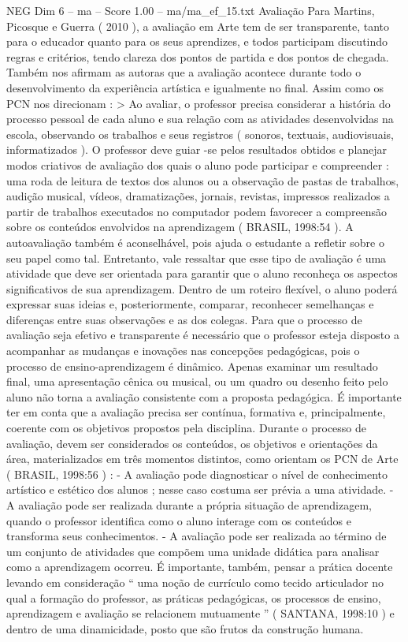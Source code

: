 \begin{textsample}{NEG Dim 6 – ma – Score 1.00 – ma/ma\_ef\_15.txt}  \label{ex:f6_neg_192}
Avaliação Para Martins, Picosque e Guerra ( 2010 ), a avaliação em Arte tem de ser transparente, tanto para o educador quanto para os seus aprendizes, e todos participam discutindo regras e critérios, tendo clareza dos pontos de partida e dos pontos de chegada.
Também nos afirmam as autoras que a avaliação acontece durante todo o desenvolvimento da experiência artística e igualmente no final.
Assim como os PCN nos direcionam : > Ao avaliar, o professor precisa considerar a história do processo pessoal de cada aluno e sua relação com as atividades desenvolvidas na escola, observando os trabalhos e seus registros ( sonoros, textuais, audiovisuais, informatizados ).
O professor deve guiar -se pelos resultados obtidos e planejar modos criativos de avaliação dos quais o aluno pode participar e compreender : uma roda de leitura de textos dos alunos ou a observação de pastas de trabalhos, audição musical, vídeos, dramatizações, jornais, revistas, impressos realizados a partir de trabalhos executados no computador podem favorecer a compreensão sobre os conteúdos envolvidos na aprendizagem ( BRASIL, 1998:54 ).
A autoavaliação também é aconselhável, pois ajuda o estudante a refletir sobre o seu papel como tal.
Entretanto, vale ressaltar que esse tipo de avaliação é uma atividade que deve ser orientada para garantir que o aluno reconheça os aspectos significativos de sua aprendizagem.
Dentro de um roteiro flexível, o aluno poderá expressar suas ideias e, posteriormente, comparar, reconhecer semelhanças e diferenças entre suas observações e as dos colegas.
Para que o processo de avaliação seja efetivo e transparente é necessário que o professor esteja disposto a acompanhar as mudanças e inovações nas concepções pedagógicas, pois o processo de ensino-aprendizagem é dinâmico.
Apenas examinar um resultado final, uma apresentação cênica ou musical, ou um quadro ou desenho feito pelo aluno não torna a avaliação consistente com a proposta pedagógica.
É importante ter em conta que a avaliação precisa ser contínua, formativa e, principalmente, coerente com os objetivos propostos pela disciplina.
Durante o processo de avaliação, devem ser considerados os conteúdos, os objetivos e orientações da área, materializados em três momentos distintos, como orientam os PCN de Arte ( BRASIL, 1998:56 ) : - A avaliação pode diagnosticar o nível de conhecimento artístico e estético dos alunos ; nesse caso costuma ser prévia a uma atividade. - A avaliação pode ser realizada durante a própria situação de aprendizagem, quando o professor identifica como o aluno interage com os conteúdos e transforma seus conhecimentos. - A avaliação pode ser realizada ao término de um conjunto de atividades que compõem uma unidade didática para analisar como a aprendizagem ocorreu.
É importante, também, pensar a prática docente levando em consideração “ uma noção de currículo como tecido articulador no qual a formação do professor, as práticas pedagógicas, os processos de ensino, aprendizagem e avaliação se relacionem mutuamente ” ( SANTANA, 1998:10 ) e dentro de uma dinamicidade, posto que são frutos da construção humana.

\end{textsample}

